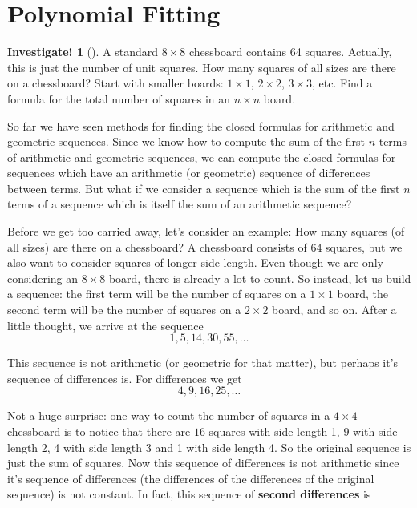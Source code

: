 \documentclass[12pt,]{book}
\newcommand{\terminology}[1]{\textbf{#1}}
\theoremstyle{plain}
\theoremstyle{definition}
\theoremstyle{definition}
\theoremstyle{definition}
\newtheorem{investigation}[project]{Investigate!}
\numberwithin{equation}{chapter}
\begin{document}
\section[{Polynomial Fitting}]{Polynomial Fitting}\label{sec_polyfit}
\begin{investigation}[]\label{investigation-6}
\hypertarget{p-225}{}%
A standard \(8 \times 8\) chessboard contains 64 squares. Actually, this is just the number of unit squares. How many squares of all sizes are there on a chessboard? Start with smaller boards: \(1\times 1\), \(2 \times 2\), \(3\times 3\), etc. Find a formula for the total number of squares in an \(n\times n\) board.%
\end{investigation}
\hypertarget{p-226}{}%
So far we have seen methods for finding the closed formulas for arithmetic and geometric sequences. Since we know how to compute the sum of the first \(n\) terms of arithmetic and geometric sequences, we can compute the closed formulas for sequences which have an arithmetic (or geometric) sequence of differences between terms. But what if we consider a sequence which is the sum of the first \(n\) terms of a sequence which is itself the sum of an arithmetic sequence?%
\par
\hypertarget{p-227}{}%
Before we get too carried away, let's consider an example: How many squares (of all sizes) are there on a chessboard? A chessboard consists of \(64\) squares, but we also want to consider squares of longer side length. Even though we are only considering an \(8 \times 8\) board, there is already a lot to count. So instead, let us build a sequence: the first term will be the number of squares on a \(1 \times 1\) board, the second term will be the number of squares on a \(2 \times 2\) board, and so on. After a little thought, we arrive at the sequence%
\begin{equation*}
1,5,14,30, 55,\ldots
\end{equation*}
%
\par
\hypertarget{p-228}{}%
This sequence is not arithmetic (or geometric for that matter), but perhaps it's sequence of differences is. For differences we get%
\begin{equation*}
4, 9, 16, 25, \ldots
\end{equation*}
%
\par
\hypertarget{p-229}{}%
Not a huge surprise: one way to count the number of squares in a \(4 \times 4\) chessboard is to notice that there are \(16\) squares with side length 1, 9 with side length 2, 4 with side length 3 and 1 with side length 4. So the original sequence is just the sum of squares. Now this sequence of differences is not arithmetic since it's sequence of differences (the differences of the differences of the original sequence) is not constant. In fact, this sequence of \terminology{second differences} is%
\end{document}
